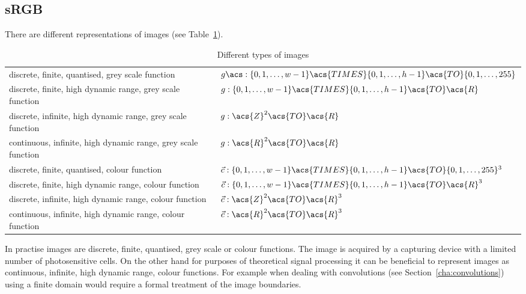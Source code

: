 \documentclass[12pt,a4paper,oneside,openright]{book}
\newcommand{\Eg}{For ex\-am\-ple }
\newcommand{\sct}[1]{Section~\ref{cha:#1}}
\newcommand{\tbl}[1]{Table~\ref{tbl:#1}}
\begin{document}
\begin{CJK}{UTF8}{}
\subsection{\acs{sRGB}}\label{cha:rgb}
There are different representations of images (see \tbl{image}).
\begin{table}[htbp]
  \begin{center}
    \caption{Different types of images\label{tbl:image}}\vspace{1em}
    \begin{small}
      \begin{tabular}{ll}\toprule
        \parbox[t]{.37\textwidth}{discrete, finite, quantised, grey scale function} &
        \parbox[t]{.55\textwidth}{$g\acs:\{0,1,\ldots,w-1\}\acs{TIMES}\{0,1,\ldots,h-1\}\acs{TO}\{0,1,\ldots,255\}$}\smallskip\\
        \parbox[t]{.37\textwidth}{discrete, finite, high dynamic range, grey scale function} &
        \parbox[t]{.55\textwidth}{$g:\{0,1,\ldots,w-1\}\acs{TIMES}\{0,1,\ldots,h-1\}\acs{TO}\acs{R}$}\smallskip\\
        \parbox[t]{.37\textwidth}{discrete, infinite, high dynamic range, grey scale function} &
        \parbox[t]{.55\textwidth}{$g:\acs{Z}^2\acs{TO}\acs{R}$}\smallskip\\
        \parbox[t]{.37\textwidth}{continuous, infinite, high dynamic range, grey scale function} &
        \parbox[t]{.55\textwidth}{$g:\acs{R}^2\acs{TO}\acs{R}$}\\\midrule
        \parbox[t]{.37\textwidth}{discrete, finite, quantised, colour function} &
        \parbox[t]{.55\textwidth}{$\vec{c}:\{0,1,\ldots,w-1\}\acs{TIMES}\{0,1,\ldots,h-1\}\acs{TO}\{0,1,\ldots,255\}^3$}\smallskip\\
        \parbox[t]{.37\textwidth}{discrete, finite, high dynamic range, colour function} &
        \parbox[t]{.55\textwidth}{$\vec{c}:\{0,1,\ldots,w-1\}\acs{TIMES}\{0,1,\ldots,h-1\}\acs{TO}\acs{R}^3$}\smallskip\\
        \parbox[t]{.37\textwidth}{discrete, infinite, high dynamic range, colour function} &
        \parbox[t]{.55\textwidth}{$\vec{c}:\acs{Z}^2\acs{TO}\acs{R}^3$}\smallskip\\
        \parbox[t]{.37\textwidth}{continuous, infinite, high dynamic range, colour function} &
        \parbox[t]{.55\textwidth}{$\vec{c}:\acs{R}^2\acs{TO}\acs{R}^3$}\\\bottomrule
      \end{tabular}
    \end{small}
  \end{center}
\end{table}
In practise images are discrete, finite, quantised, grey scale or colour functions. The image is acquired by a capturing device with a limited number of photosensitive cells. On the other hand for purposes of theoretical signal processing it can be beneficial to represent images as continuous, infinite, high dynamic range, colour functions. \Eg when dealing with convolutions (see \sct{convolutions}) using a finite domain would require a formal treatment of the image boundaries.


\end{CJK}
\end{document}
